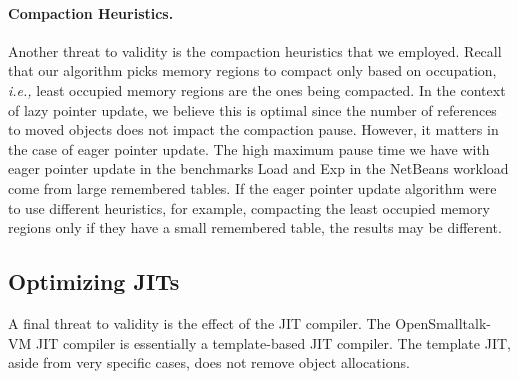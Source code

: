 \documentclass[sigplan,10pt,review,anonymous]{acmart}\settopmatter{printfolios=true,printccs=false,printacmref=false}
\newcommand{\todo}[1]{\color{orange}\fbox{\bfseries\sffamily\scriptsize TODO:}{\sf\small$\blacktriangleright$\textit{#1}$\blacktriangleleft$}\color{black}}
\def\OpenSmalltalkVM{OpenSmalltalk-VM\xspace}
\def\ie{\emph{i.e., }}
\begin{document}
%

\paragraph{Compaction Heuristics.} 
Another threat to validity is the compaction heuristics that we employed.
Recall that our algorithm picks memory regions to compact only based on occupation, \ie least occupied memory regions are the ones being compacted. In the context of lazy pointer update, we believe this is optimal since the number of references to moved objects does not impact the compaction pause. %
However, it matters in the case of eager pointer update. The high maximum pause time we have with eager pointer update in the benchmarks Load and Exp in the NetBeans workload come from large remembered tables. If the eager pointer update algorithm were to use different heuristics, for example, compacting the least occupied memory regions only if they have a small remembered table, the results may be different. 


\subsection{Optimizing JITs} 
\label{sec:optJITDisc}
A final threat to validity is the effect of the JIT compiler. The \OpenSmalltalkVM JIT compiler is essentially a template-based JIT compiler. The template JIT, aside from very specific cases, does not remove object allocations. 
\end{document}
